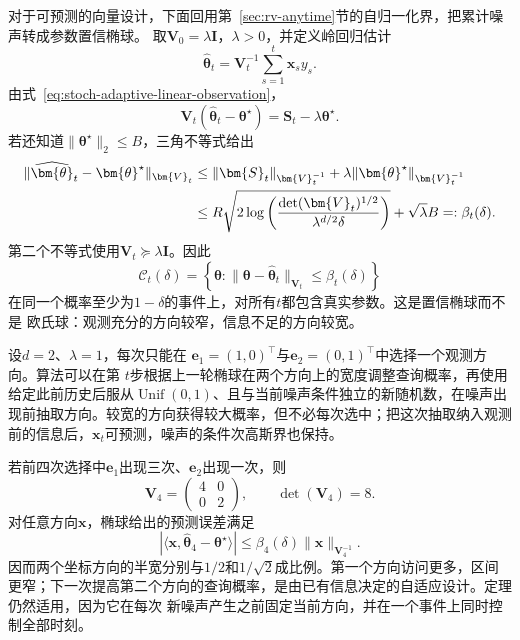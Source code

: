 对于可预测的向量设计，下面回用第~\ref{sec:rv-anytime}节的自归一化界，把累计噪声转成参数置信椭球。
取$\bm{V}_0=\lambda\bm{I}$，$\lambda>0$，并定义岭回归估计
\begin{equation}
  \widehat{\bm{\theta}}_t
  =\bm{V}_t^{-1}\sum_{s=1}^{t}\bm{x}_s y_s.
  \label{eq:stoch-ridge-estimator}
\end{equation}
由式~\eqref{eq:stoch-adaptive-linear-observation}，
\[
  \bm{V}_t
  (\widehat{\bm{\theta}}_t-\bm{\theta}^{\star})
  =
  \bm{S}_t-\lambda\bm{\theta}^{\star}.
  \]
若还知道$\lVert\bm{\theta}^{\star}\rVert_2\leq B$，三角不等式给出
\begin{align}
  \lVert
    \widehat{\bm{\theta}}_t-\bm{\theta}^{\star}
  \rVert_{\bm{V}_t}
  &\leq
  \lVert\bm{S}_t\rVert_{\bm{V}_t^{-1}}
  +
  \lambda
  \lVert\bm{\theta}^{\star}\rVert_{\bm{V}_t^{-1}}
  \notag\\
  &\leq
  R\sqrt{
    2\log\left(
      \frac{\det(\bm{V}_t)^{1/2}}
           {\lambda^{d/2}\delta}
    \right)
  }
  +\sqrt{\lambda}B
  =:\beta_t(\delta).
  \label{eq:stoch-adaptive-confidence-ellipsoid}
\end{align}
第二个不等式使用$\bm{V}_t\succeq\lambda\bm{I}$。因此
\[
  \mathcal{C}_t(\delta)
  =
  \left\{
    \bm{\theta}:
    \lVert\bm{\theta}-\widehat{\bm{\theta}}_t
    \rVert_{\bm{V}_t}
    \leq\beta_t(\delta)
  \right\}
\]
在同一个概率至少为$1-\delta$的事件上，对所有$t$都包含真实参数。这是置信椭球而不是
欧氏球：观测充分的方向较窄，信息不足的方向较宽。

\begin{example}[二维自适应查询]
  \label{ex:stoch-two-dimensional-adaptive-design}
  设$d=2$、$\lambda=1$，每次只能在
  $\bm{e}_1=(1,0)^\top$与$\bm{e}_2=(0,1)^\top$中选择一个观测方向。算法可以在第
  $t$步根据上一轮椭球在两个方向上的宽度调整查询概率，再使用给定此前历史后服从\(\operatorname{Unif}(0,1)\)、且与当前噪声条件独立的新随机数，在噪声出现前抽取方向。较宽的方向获得较大概率，但不必每次选中；把这次抽取纳入观测前的信息后，$\bm{x}_t$可预测，噪声的条件次高斯界也保持。

  若前四次选择中$\bm{e}_1$出现三次、$\bm{e}_2$出现一次，则
  \[
    \bm{V}_4
    =
    \begin{pmatrix}
      4&0\\
      0&2
    \end{pmatrix},
    \qquad
    \det(\bm{V}_4)=8.
  \]
  对任意方向$\bm{x}$，椭球给出的预测误差满足
  \[
    |\langle
      \bm{x},
      \widehat{\bm{\theta}}_4-\bm{\theta}^{\star}
    \rangle|
    \leq
    \beta_4(\delta)
    \lVert\bm{x}\rVert_{\bm{V}_4^{-1}}.
  \]
  因而两个坐标方向的半宽分别与$1/2$和$1/\sqrt2$成比例。第一个方向访问更多，区间
  更窄；下一次提高第二个方向的查询概率，是由已有信息决定的自适应设计。定理仍然适用，因为它在每次
  新噪声产生之前固定当前方向，并在一个事件上同时控制全部时刻。
\end{example}

